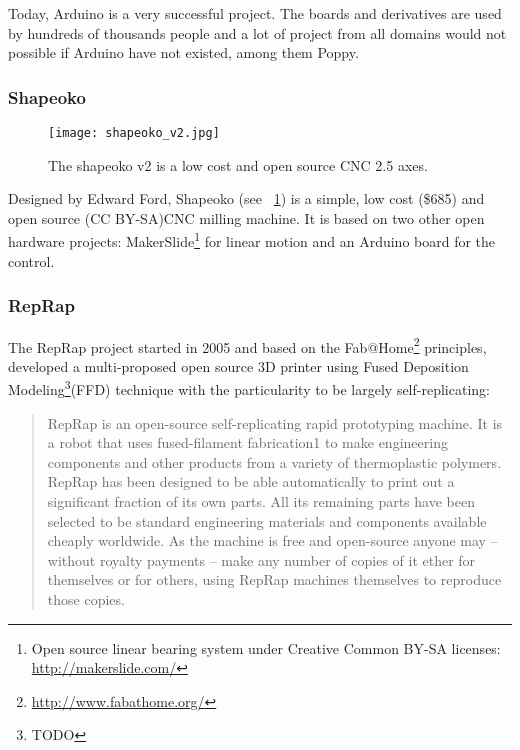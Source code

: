 Today, Arduino is a very successful project. The boards and derivatives are used by hundreds of thousands people and a lot of project from all domains would not possible if Arduino have not existed, among them Poppy.

\subsubsection{Shapeoko}

\begin{figure}[!h]
    \begin{center}
        \texttt{[image: shapeoko\_v2.jpg]}
    \end{center}
    \caption{The shapeoko v2 is a low cost and open source CNC 2.5 axes.}
    \label{fig:shapeoko}
\end{figure}

Designed by Edward Ford, Shapeoko (see \figurename~\ref{fig:shapeoko}) is a simple, low cost (\$685) and open source (CC BY-SA)CNC milling machine. It is based on two other open hardware projects: MakerSlide\footnote{Open source linear bearing system under Creative Common BY-SA licenses: \url{http://makerslide.com/}} for linear motion and an Arduino board for the control.



\subsubsection{RepRap} %

The RepRap project started in 2005 and based on the Fab@Home\footnote{\url{http://www.fabathome.org/}} principles, developed a multi-proposed open source 3D printer using Fused Deposition Modeling\footnote{TODO}(FFD) technique with the particularity to be largely self-replicating:

\begin{quotation}
    RepRap is an open-source self-replicating rapid prototyping machine. It is a robot that uses fused-filament fabrication1 to make engineering components and other products from a variety of thermoplastic polymers. RepRap has been designed to be able automatically to print out a significant fraction of its own parts. All its remaining parts have been selected to be standard engineering materials and components available cheaply worldwide. As the machine is free and open-source anyone may – without royalty payments – make any number of copies of it ether for themselves or for others, using RepRap machines themselves to reproduce those copies.

\end{quotation}


